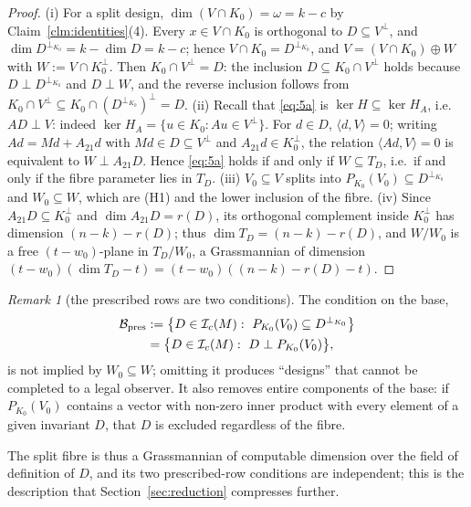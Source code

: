 \documentclass[journal]{IEEEtran}
\theoremstyle{plainn}
\theoremstyle{remark}
\newtheorem{remark}{Remark}
\begin{document}
\begin{proof}
(i) For a split design, $\dim(V\cap K_0)=\omega=k-c$ by Claim~\ref{clm:identities}(4). Every
$x\in V\cap K_0$ is orthogonal to $D\subseteq V^\perp$, and $\dim D^{\perp_{K_0}}=k-\dim D=k-c$; hence
$V\cap K_0=D^{\perp_{K_0}}$, and $V=(V\cap K_0)\oplus W$ with $W:=V\cap K_0^\perp$. Then
$K_0\cap V^\perp=D$: the inclusion $D\subseteq K_0\cap V^\perp$ holds because $D\perp D^{\perp_{K_0}}$ and
$D\perp W$, and the reverse inclusion follows from
$K_0\cap V^\perp\subseteq K_0\cap(D^{\perp_{K_0}})^\perp=D$.
(ii) Recall that \eqref{eq:5a} is $\ker H\subseteq\ker H_A$, i.e.\ $AD\perp V$: indeed
$\ker H_A=\{u\in K_0:Au\in V^\perp\}$. For $d\in D$, $\langle d,V\rangle=0$; writing $Ad=Md+A_{21}d$
with $Md\in D\subseteq V^\perp$ and $A_{21}d\in K_0^\perp$, the relation $\langle Ad,V\rangle=0$ is
equivalent to $W\perp A_{21}D$. Hence \eqref{eq:5a} holds if and only if $W\subseteq T_D$, i.e.\ if and
only if the fibre parameter lies in $T_D$.
(iii) $V_0\subseteq V$ splits into $P_{K_0}(V_0)\subseteq D^{\perp_{K_0}}$ and $W_0\subseteq W$, which are
(H1) and the lower inclusion of the fibre.
(iv) Since $A_{21}D\subseteq K_0^\perp$ and $\dim A_{21}D=r(D)$, its orthogonal complement inside
$K_0^\perp$ has dimension $(n-k)-r(D)$; thus $\dim T_D=(n-k)-r(D)$, and $W/W_0$ is a free
$(t-w_0)$-plane in $T_D/W_0$, a Grassmannian of dimension
$(t-w_0)(\dim T_D-t)=(t-w_0)((n-k)-r(D)-t)$.
\end{proof}

\begin{remark}[the prescribed rows are two conditions]\label{rem:presrows}
The condition on the base,
\begin{equation}\label{eq:bpres}
\begin{aligned}
\mathcal B_{\rm pres}&:=\bigl\{D\in\mathcal I_c(M):\ P_{K_0}(V_0)\subseteq D^{\perp_{K_0}}\bigr\}\\
&=\bigl\{D\in\mathcal I_c(M):\ D\perp P_{K_0}(V_0)\bigr\},
\end{aligned}
\end{equation}
is not implied by $W_0\subseteq W$; omitting it produces ``designs'' that cannot be completed to a legal
observer. It also removes entire components of the base: if $P_{K_0}(V_0)$ contains a vector with
non-zero inner product with every element of a given invariant $D$, that $D$ is excluded regardless of
the fibre.
\end{remark}

The split fibre is thus a Grassmannian of computable dimension over the field of definition of $D$, and
its two prescribed-row conditions are independent; this is the description that
Section~\ref{sec:reduction} compresses further.
\end{document}
